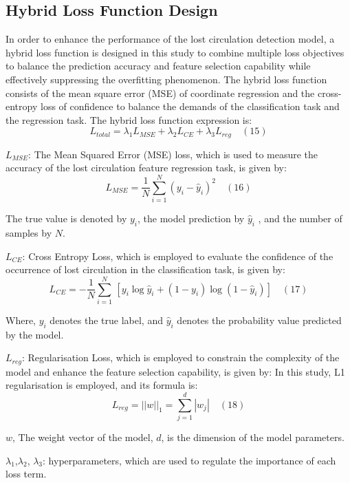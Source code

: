 \documentclass[journal,article,submit,pdftex,moreauthors]{Definitions/mdpi}
\begin{document}
\subsection{Hybrid Loss Function Design }
 
In order to enhance the performance of the lost circulation detection model, a hybrid loss function is designed in this study to combine multiple loss objectives to balance the prediction accuracy and feature selection capability while effectively suppressing the overfitting phenomenon. The hybrid loss function consists of the mean square error (MSE) of coordinate regression and the cross-entropy loss of confidence to balance the demands of the classification task and the regression task. The hybrid loss function expression is:
$$ L _ { t o t a l } = \lambda _ { 1 } L _ { M S E } + \lambda _ { 2 } L _ { C E } + \lambda _ { 3 } L _ { r e g }\quad (15)$$

\( L _ { M S E } \): The Mean Squared Error (MSE) loss, which is used to measure the accuracy of the lost circulation feature regression task, is given by:
$$ L _ { M S E } = \frac { 1 } { N } \sum _ { i = 1 } ^ { N } ( y _ { i } - \widehat { y } _ { i } ) ^ { 2 }\quad (16)$$

The true value is denoted by \({ y } _ { i } \), the model prediction by \(\widehat { y } _ { i }\) , and the number of samples by \(N\).


\(L _ { CE}\): Cross Entropy Loss, which is employed to evaluate the confidence of the occurrence of lost circulation in the classification task, is given by:
\[{{L}_{CE}}=-\frac{1}{N}\underset{i=1}{\overset{N}{\mathop \sum }}\,\left[ {{y}_{i}}\log {{{\hat{y}}}_{i}}+(1-{{y}_{i}})\log (1-{{{\hat{y}}}_{i}}) \right]\quad (17)\]

Where, \({y}_{i}\) denotes the true label, and \({\hat{y}}_{i}\) denotes the probability value predicted by the model.

\({L}_{reg
}\): Regularisation Loss, which is employed to constrain the complexity of the model and enhance the feature selection capability, is given by: In this study, L1 regularisation is employed, and its formula is:
$$ L _ { r e g } = | | w | | _ { 1 } = \sum _ { j = 1 } ^ { d } | w _ { j } |\quad (18)$$

\(w\), The weight vector of the model, \(d\), is the dimension of the model parameters.

\({{\lambda }_{1}}\),\({{\lambda }_{2}}\), \({{\lambda }_{3}}\): hyperparameters, which are used to regulate the importance of each loss term. 
\end{document}
